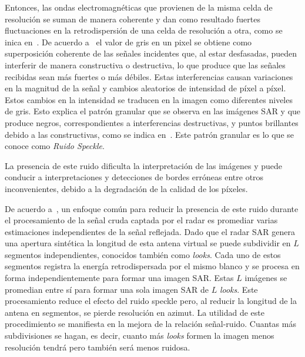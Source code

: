 Entonces, las ondas electromagnéticas que provienen de la misma celda de resolución se suman de manera coherente y dan como resultado fuertes fluctuaciones en la retrodispersión de una celda de resolución a otra, como se inica en~\citet{oliverquegan98}. De acuerdo a~\citet{Shahrezaei2019} el valor de gris en un pixel se obtiene como superposición coherente de las señales incidentes que, al estar desfasadas, pueden interferir de manera constructiva o destructiva, lo que produce que las señales recibidas sean más fuertes o más débiles. Estas interferencias causan variaciones en la magnitud de la señal y cambios aleatorios de intensidad de píxel a píxel. Estos cambios en la intensidad se traducen en la imagen como diferentes niveles de gris. Esto explica el patrón granular que se observa en las imágenes SAR y que produce negros, correspondientes a interferencias destructivas, y puntos brillantes debido a las constructivas, como se indica en~\citet{Yahya2014}. Este patrón granular es lo que se conoce como \textit{Ruido Speckle}.

La presencia de este ruido dificulta la interpretación de las imágenes y puede conducir a interpretaciones y detecciones de bordes erróneas entre otros inconvenientes, debido a la degradación de la calidad de los píxeles. 

De acuerdo a~\citet{Lee2009}, un enfoque común para reducir la presencia de este ruido durante el procesamiento de la señal cruda captada por el radar es promediar varias estimaciones independientes de la señal reflejada. Dado que el radar SAR genera una apertura sintética la longitud de esta antena virtual se puede subdividir en $L$  segmentos independientes, conocidos también como \textit{looks}. Cada uno de estos segmentos registra la energía retrodispersada por el mismo blanco y se procesa en forma independientemente para formar una imagen SAR. Estas $L$ imágenes se promedian entre sí para formar una sola imagen SAR de $L$ \textit{looks}. Este procesamiento reduce el efecto del ruido speckle pero, al reducir la longitud de la antena en segmentos, se pierde resolución en azimut. La utilidad de este procedimiento se manifiesta en la mejora de la relación señal-ruido. Cuantas más subdivisiones se hagan, es decir, cuanto más \textit{looks} formen la imagen menos resolución tendrá pero también será menos ruidosa.

